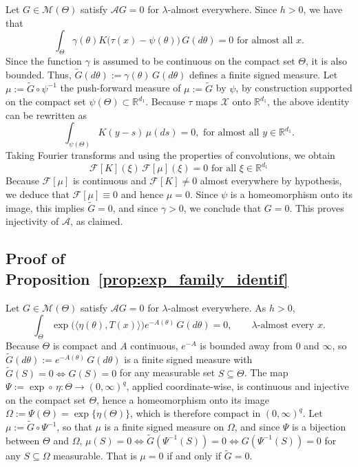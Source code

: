 \documentclass[11pt,twoside]{article} %
\begin{document}
Let $G\in\mathcal M(\Theta)$ satisfy $\mathcal AG=0$ for $\lambda$-almost everywhere. Since $h>0$, we have that
\begin{equation*}
    \int_\Theta\gamma(\theta)K\big(\tau(x)-\psi(\theta)\big)\,G(d\theta)=0 \text{ for almost all } x.
\end{equation*}
Since the function $\gamma$ is assumed to be continuous
on the compact set $\Theta$, it is also bounded. Thus, $\tilde G(d\theta):=\gamma(\theta)\,G(d\theta)$ defines a finite signed measure. Let
$\mu:=\tilde G\circ \psi^{-1}$ the push-forward measure of $\mu:=\tilde G$   by $\psi$, by construction  supported on the compact set $\psi(\Theta)\subset\mathbb R^{d_1}$. Because $\tau$
maps $\mathcal X$ onto $\mathbb R^{d_1}$, the above identity can be rewritten as
\begin{equation*}
    \int_{\psi(\Theta)}K(y-s)\,\mu(ds)=0, \text{ for almost all } y\in\mathbb R^{d_1}.
\end{equation*}
Taking Fourier transforms and using the properties of convolutions, we obtain \begin{equation*}
    \mathcal F[K](\xi) \,\mathcal F[\mu](\xi) =0 \text{ for all } \xi \in \mathbb R^{d_1}
\end{equation*}
Because $\mathcal F[\mu]$ is
continuous and $\mathcal F[K]\ne0$ almost everywhere by hypothesis, we deduce that $\mathcal F[\mu]\equiv0$ and hence
$\mu=0$. Since $\psi$ is a homeomorphism onto its image, this implies $\tilde G=0$, and since $\gamma>0$, we conclude that $G=0$. This proves injectivity of $\mathcal A$, as claimed.

\subsection{Proof of Proposition~\ref{prop:exp_family_identif}}
\label{app:proof:prop_exp_family_identif}

Let $G\in\mathcal M(\Theta)$ satisfy $\mathcal AG=0$ for $\lambda$-almost everywhere. As $h>0$,
\begin{equation*}
    \int_\Theta\exp\big(\langle\eta(\theta),T(x)\rangle\big)e^{-A(\theta)}\,G(d\theta)=0,
    \qquad\lambda\text{-almost every\ }x .
\end{equation*}
Because $\Theta$ is compact and $A$ continuous, $e^{-A}$ is bounded away from $0$ and $\infty$, so
$\tilde G(d\theta):=e^{-A(\theta)}\,G(d\theta)$ is a finite signed measure with
$\tilde G(S)=0\Leftrightarrow G(S)=0$ for any measurable set $S\subseteq\Theta$. The map
$\Psi:=\exp\circ\,\eta:\Theta\to(0,\infty)^q$, applied coordinate-wise, is continuous and injective on the
compact set $\Theta$, hence a homeomorphism onto its image $\Omega:=\Psi(\Theta)=\exp\{\eta(\Theta)\}$, which
is therefore compact in $(0,\infty)^q$. Let $\mu:=\tilde G\circ \Psi^{-1}$, so that $\mu$ is a finite
signed measure on $\Omega$, and since $\Psi$ is a bijection between $\Theta$ and $\Omega$,
$\mu(S)=0\Leftrightarrow\tilde G(\Psi^{-1}(S))=0\Leftrightarrow G(\Psi^{-1}(S))=0$ for any $S\subseteq \Omega$ measurable. That is $\mu=0$ if and only if $\tilde G=0$.
\end{document}
